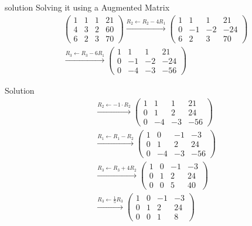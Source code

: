 \documentclass{beamer}
\begin{document}
\begin{frame}{solution}
Solving it using a Augmented Matrix
\begin{align}
&\left(
\begin{array}{ccc|c}
1 & 1 & 1 & 21 \\
4 & 3 & 2 & 60 \\
6 & 2 & 3 & 70
\end{array}
\right)
\xrightarrow{R_2 \gets R_2 - 4R_1}
\left(
\begin{array}{ccc|c}
1 & 1 & 1 & 21 \\
0 & -1 & -2 & -24 \\
6 & 2 & 3 & 70
\end{array}
\right) \\[12pt]
&\xrightarrow{R_3 \gets R_3 - 6R_1}
\left(
\begin{array}{ccc|c}
1 & 1 & 1 & 21 \\
0 & -1 & -2 & -24 \\
0 & -4 & -3 & -56
\end{array}
\right) 
\end{align}
\end{frame}
\begin{frame}{Solution}
\begin{align}
&\xrightarrow{R_2 \gets -1 \cdot R_2}
\left(
\begin{array}{ccc|c}
1 & 1 & 1 & 21 \\
0 & 1 & 2 & 24 \\
0 & -4 & -3 & -56
\end{array}
\right) \\[12pt]
&\xrightarrow{R_1 \gets R_1 - R_2}
\left(
\begin{array}{ccc|c}
1 & 0 & -1 & -3 \\
0 & 1 & 2 & 24 \\
0 & -4 & -3 & -56
\end{array}
\right) \\[12pt]
&\xrightarrow{R_3 \gets R_3 + 4R_2}
\left(
\begin{array}{ccc|c}
1 & 0 & -1 & -3 \\
0 & 1 & 2 & 24 \\
0 & 0 & 5 & 40
\end{array}
\right) \\[12pt]
&\xrightarrow{R_3 \gets \frac{1}{5} R_3}
\left(
\begin{array}{ccc|c}
1 & 0 & -1 & -3 \\
0 & 1 & 2 & 24 \\
0 & 0 & 1 & 8
\end{array}
\right) \\[12pt]
\end{align}
\end{frame}
\end{document}

